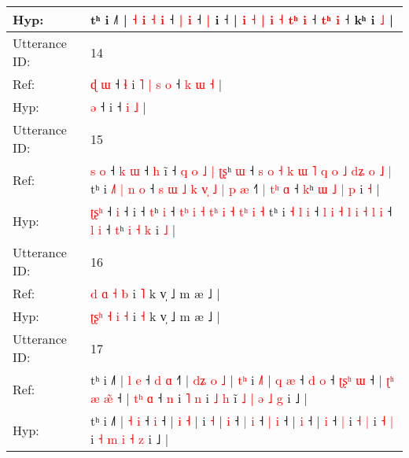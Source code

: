 \documentclass[10pt]{article}
\DeclareRobustCommand{\hl}[1]{{\textcolor{red}{#1}}}
\begin{document}
\begin{longtable}{ll}
 \\
Hyp: & tʰ i ˩˥ | \hl{}\hl{˧}\hl{ }\hl{i} \hl{˧} \hl{i} ˧ \hl{|} \hl{i} ˧ \hl{|} i ˧ |\hl{ }\hl{i} \hl{˧} \hl{|} \hl{i} \hl{˧} \hl{t}\hl{ʰ} \hl{i} ˧ \hl{t}\hl{ʰ} \hl{i} ˧ kʰ i \hl{}\hl{˩} |
 \\
\midrule
Utterance ID: & 14 \\
Ref: & \hl{ɖ}\hl{ }\hl{ɯ} ˧\hl{ }\hl{ɬ} i\hl{ }\hl{˥}\hl{ }\hl{|}\hl{ }\hl{s}\hl{ }\hl{o} ˧\hl{ }\hl{k} \hl{ɯ} \hl{˧} |
 \\
Hyp: & \hl{}\hl{}\hl{ə} ˧\hl{}\hl{} i\hl{}\hl{}\hl{}\hl{}\hl{}\hl{}\hl{}\hl{} ˧\hl{}\hl{} \hl{i} \hl{˩} |
 \\
\midrule
Utterance ID: & 15 \\
Ref: & \hl{s}\hl{ }\hl{o} ˧\hl{ }\hl{k} \hl{ɯ} ˧\hl{ }\hl{h} i\hl{̃} ˧\hl{ }\hl{q}\hl{ }\hl{o}\hl{ }\hl{˩}\hl{ }\hl{|} \hl{ʈ}\hl{ʂ}ʰ \hl{ɯ} ˧\hl{ }\hl{s} \hl{o}\hl{ }\hl{˧} \hl{k} \hl{ɯ} \hl{˥}\hl{ }\hl{q} \hl{o} \hl{˩} \hl{d}\hl{ʑ}\hl{ }\hl{o} \hl{˩} \hl{|} tʰ i\hl{ }\hl{˩}\hl{˥} \hl{|} \hl{n} \hl{o} ˧\hl{ }\hl{s} \hl{ɯ} \hl{˩} \hl{k} \hl{v}\hl{̩} \hl{˩} \hl{|} \hl{p} \hl{æ} ˧\hl{˥}\hl{ }\hl{|} \hl{t}\hl{ʰ} \hl{ɑ} ˧ \hl{k}ʰ\hl{ }\hl{ɯ} \hl{˩} \hl{|} \hl{p} i \hl{˧} |
 \\
Hyp: & \hl{ʈ}\hl{ʂ}\hl{ʰ} ˧\hl{}\hl{} \hl{i} ˧\hl{}\hl{} i\hl{} ˧\hl{}\hl{}\hl{}\hl{}\hl{}\hl{}\hl{}\hl{} \hl{}\hl{t}ʰ \hl{i} ˧\hl{}\hl{} \hl{}\hl{t}\hl{ʰ} \hl{i} \hl{˧} \hl{}\hl{t}\hl{ʰ} \hl{i} \hl{˧} \hl{}\hl{}\hl{t}\hl{ʰ} \hl{i} \hl{˧} tʰ i\hl{}\hl{}\hl{} \hl{˧} \hl{l} \hl{i} ˧\hl{}\hl{} \hl{l} \hl{i} \hl{˧} \hl{}\hl{l} \hl{i} \hl{˧} \hl{l} \hl{i} ˧\hl{}\hl{}\hl{} \hl{}\hl{l} \hl{i} ˧ \hl{t}ʰ\hl{}\hl{} \hl{i} \hl{˧} \hl{k} i \hl{˩} |
 \\
\midrule
Utterance ID: & 16 \\
Ref: & \hl{}\hl{}\hl{d} \hl{ɑ} \hl{˧} \hl{b} i \hl{˥} k v̩ ˩ m æ ˩ |
 \\
Hyp: & \hl{ʈ}\hl{ʂ}\hl{ʰ} \hl{˧} \hl{i} \hl{˧} i \hl{˧} k v̩ ˩ m æ ˩ |
 \\
\midrule
Utterance ID: & 17 \\
Ref: & tʰ i ˩˥ | \hl{l} \hl{e} ˧\hl{ }\hl{d} \hl{ɑ} ˧\hl{˥} |\hl{ }\hl{d}\hl{ʑ} \hl{o} \hl{˩} |\hl{ }\hl{t}\hl{ʰ} i \hl{˩}\hl{˥} |\hl{ }\hl{q} \hl{æ} ˧ \hl{d} \hl{o} ˧ \hl{ʈ}\hl{ʂ}\hl{ʰ} \hl{ɯ} ˧ |\hl{ }\hl{ʈ}\hl{ʰ}\hl{ }\hl{æ} \hl{æ}\hl{̃} ˧ |\hl{ }\hl{t}\hl{ʰ} \hl{ɑ} ˧ \hl{n} i \hl{˥} \hl{n} i \hl{˩} \hl{h} i\hl{̃} \hl{˩} \hl{|} \hl{ə} \hl{˩} \hl{g} i ˩ |
 \\
Hyp: & tʰ i ˩˥ | \hl{˧} \hl{i} ˧\hl{}\hl{} \hl{i} ˧\hl{} |\hl{}\hl{}\hl{} \hl{i} \hl{˧} |\hl{}\hl{}\hl{} i \hl{}\hl{˧} |\hl{}\hl{} \hl{i} ˧ \hl{|} \hl{i} ˧ \hl{}\hl{}\hl{|} \hl{i} ˧ |\hl{}\hl{}\hl{}\hl{}\hl{} \hl{}\hl{i} ˧ |\hl{}\hl{}\hl{} \hl{i} ˧ \hl{|} i \hl{˧} \hl{|} i \hl{˧} \hl{|} i\hl{} \hl{˧} \hl{m} \hl{i} \hl{˧} \hl{z} i ˩ |

\end{longtable}
\end{document}
